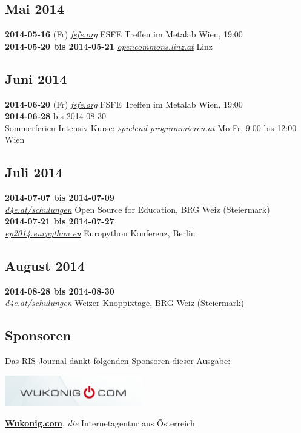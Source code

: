 \subsection*{Mai 2014}
\textbf{2014-05-16} (Fr) \href{http://fsfe.org}{\textit{fsfe.org}} FSFE Treffen im Metalab Wien, 19:00\\
\textbf{2014-05-20 bis 2014-05-21} \href{http://www.opencommons.linz.at/}{\textit{opencommons.linz.at}} Linz\\
\subsection*{Juni 2014}
\textbf{2014-06-20} (Fr) \href{http://fsfe.org}{\textit{fsfe.org}} FSFE Treffen im Metalab Wien, 19:00\\
\textbf{2014-06-28} bis 2014-08-30\\ Sommerferien Intensiv Kurse: \href{http://spielend-programmieren.at}{\textit{spielend-programmieren.at}} Mo-Fr, 9:00 bis 12:00 Wien\\
\subsection*{Juli 2014}
\textbf{2014-07-07 bis 2014-07-09}\\ \href{http://d4e.at/schulungen/}{\textit{d4e.at/schulungen}} Open Source for Education, BRG Weiz (Steiermark)\\
\textbf{2014-07-21 bis 2014-07-27}\\ \href{https://ep2014.europython.eu/en/}{\textit{ep2014.eurpython.eu}} Europython Konferenz, Berlin\\
\subsection*{August 2014}
\textbf{2014-08-28 bis 2014-08-30}\\ \href{http://d4e.at/schulungen/}{\textit{d4e.at/schulungen}} Weizer Knoppixtage, BRG Weiz (Steiermark)\\
\subsection*{Sponsoren}
Das RIS-Journal dankt folgenden Sponsoren dieser Ausgabe:
\begin{center}
\includegraphics[width=6cm]{impressum/wukonig.png}
\end{center}
\href{http://wukonig.com}{\textbf{Wukonig.com}}, \textit{die} Internetagentur aus Österreich
